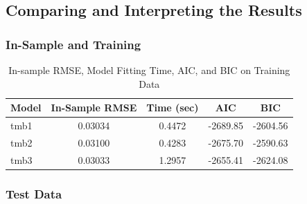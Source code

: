 \documentclass[12pt, twoside,hidelinks]{article}
\theoremstyle{definition}
\numberwithin{equation}{section}
\begin{document}
\subsection{Comparing and Interpreting the Results}


\subsubsection*{In-Sample and Training}


\begin{table}[h]
\centering
\begin{tabular}{|l|c|c|c|c|}
\hline
Model & In-Sample RMSE & Time (sec) & AIC & BIC \\
\hline
tmb1 & 0.03034 & 0.4472 & -2689.85 & -2604.56 \\
tmb2 & 0.03100 & 0.4283 & -2675.70 & -2590.63 \\
tmb3 & 0.03033 & 1.2957 & -2655.41 & -2624.08 \\
\hline
\end{tabular}
\caption{In-sample RMSE, Model Fitting Time, AIC, and BIC on Training Data}
\end{table}


\subsubsection*{Test Data}
\newpage
\end{document}
